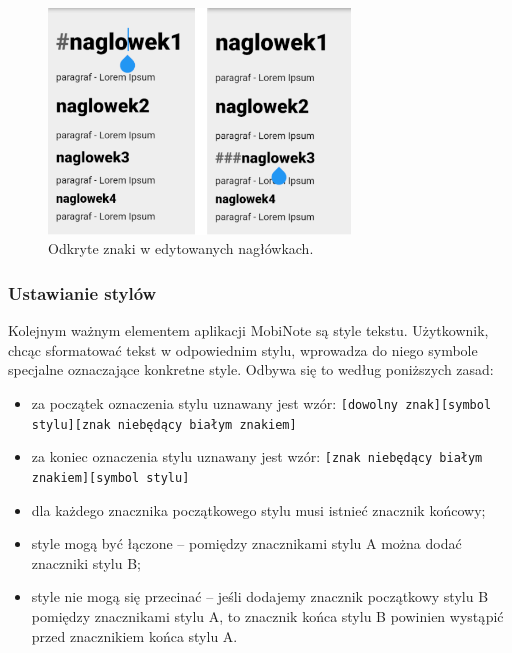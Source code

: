 \begin{figure}[ht]
    \centering
    \includegraphics[height=6cm]{images/pokazywanie_naglowkow.png}
    \caption{Odkryte znaki w edytowanych nagłówkach.}
\end{figure}

\subsubsection{Ustawianie stylów}
\label{subsec:ustawianieStyli}

Kolejnym ważnym elementem aplikacji MobiNote są style tekstu. Użytkownik, chcąc sformatować tekst w odpowiednim stylu, wprowadza do niego symbole specjalne oznaczające konkretne style.
Odbywa się to według poniższych zasad:

\begin{itemize}
    \setlength\itemsep{2mm}

    \item za początek oznaczenia stylu uznawany jest wzór: \newline
    \verb|[dowolny znak][symbol stylu][znak niebędący białym znakiem]|
    
    \item za koniec oznaczenia stylu uznawany jest wzór: \newline
    \verb|[znak niebędący białym znakiem][symbol stylu]|

    \item dla każdego znacznika początkowego stylu musi istnieć znacznik końcowy;
    
    \item style mogą być łączone -- pomiędzy znacznikami stylu A można dodać znaczniki stylu B;

    \item style nie mogą się przecinać -- jeśli dodajemy znacznik początkowy stylu B pomiędzy znacznikami stylu A, to znacznik końca stylu B powinien wystąpić przed znacznikiem końca stylu A. 
\end{itemize}

